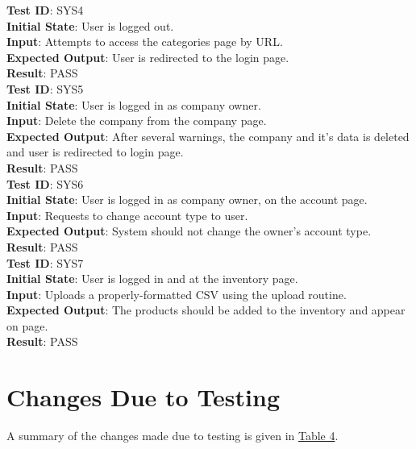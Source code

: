 \documentclass[12pt, titlepage]{article}
\begin{document}
\noindent
\textbf{Test ID}: SYS4\\
\textbf{Initial State}: User is logged out.\\
\textbf{Input}: Attempts to access the categories page by URL.\\
\textbf{Expected Output}: User is redirected to the login page.\\
\textbf{Result}: PASS\\

\noindent
\textbf{Test ID}: SYS5\\
\textbf{Initial State}: User is logged in as company owner.\\
\textbf{Input}: Delete the company from the company page.\\
\textbf{Expected Output}: After several warnings, the company and it's data is deleted and user is redirected to login page.\\
\textbf{Result}: PASS\\

\noindent
\textbf{Test ID}: SYS6\\
\textbf{Initial State}: User is logged in as company owner, on the account page.\\
\textbf{Input}: Requests to change account type to user.\\
\textbf{Expected Output}: System should not change the owner's account type.\\
\textbf{Result}: PASS\\

\noindent
\textbf{Test ID}: SYS7\\
\textbf{Initial State}: User is logged in and at the inventory page.\\
\textbf{Input}: Uploads a properly-formatted CSV using the upload routine.\\
\textbf{Expected Output}: The products should be added to the inventory and appear on page.\\
\textbf{Result}: PASS\\


\section{Changes Due to Testing}
A summary of the changes made due to testing is given in \hyperref[fig:table4]{Table 4}.
\end{document}
